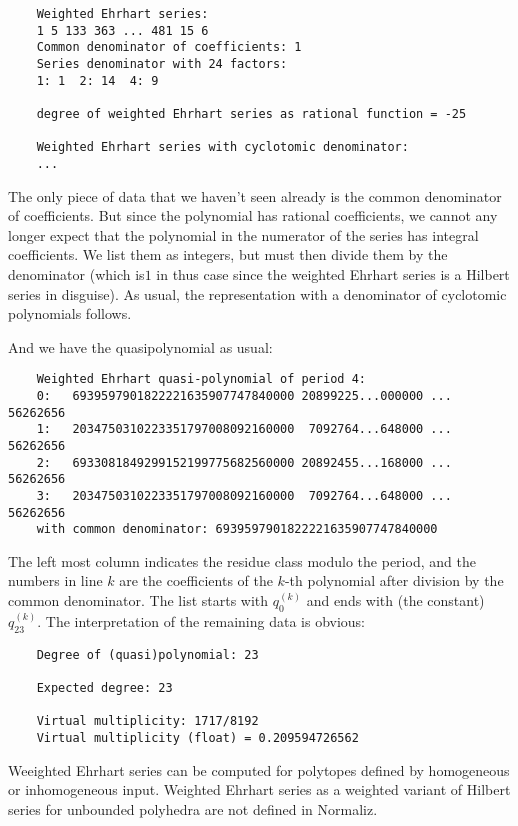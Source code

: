 \documentclass[12pt,a4paper]{scrartcl}
\theoremstyle{definition}
\begin{document}
{	\begin{Verbatim}
	Weighted Ehrhart series:
	1 5 133 363 ... 481 15 6
	Common denominator of coefficients: 1
	Series denominator with 24 factors:
	1: 1  2: 14  4: 9
	
	degree of weighted Ehrhart series as rational function = -25
	
	Weighted Ehrhart series with cyclotomic denominator:
	...
	\end{Verbatim}
	The only piece of data that we haven't seen already is the common denominator of coefficients. But since the polynomial has rational coefficients, we cannot any longer expect that the polynomial in the numerator of the series has integral coefficients. We list them as integers, but must then divide them by the denominator (which is$1$ in thus case since the weighted Ehrhart series is a Hilbert series in disguise). As usual, the representation with a denominator of cyclotomic polynomials follows.
	
	And we have the quasipolynomial as usual:
	
	\begin{Verbatim}
	Weighted Ehrhart quasi-polynomial of period 4:
	0:   6939597901822221635907747840000 20899225...000000 ... 56262656
	1:   2034750310223351797008092160000  7092764...648000 ... 56262656
	2:   6933081849299152199775682560000 20892455...168000 ... 56262656
	3:   2034750310223351797008092160000  7092764...648000 ... 56262656
	with common denominator: 6939597901822221635907747840000
	\end{Verbatim}
	
	The left most column indicates the residue class modulo the period, and the
	numbers in line $k$ are the coefficients of the $k$-th polynomial after
	division by the common denominator. The list starts with $q_0^{(k)}$ and ends
	with (the constant) $q_{23}^{(k)}$.
	The interpretation of the remaining data is obvious:
	
	\begin{Verbatim}
	Degree of (quasi)polynomial: 23
	
	Expected degree: 23
	
	Virtual multiplicity: 1717/8192
	Virtual multiplicity (float) = 0.209594726562
	\end{Verbatim}
	
	Weeighted Ehrhart series can be computed for polytopes defined by homogeneous or inhomogeneous input. Weighted Ehrhart series as a weighted variant of Hilbert series for unbounded polyhedra are not defined in Normaliz.
	
}
\end{document}
